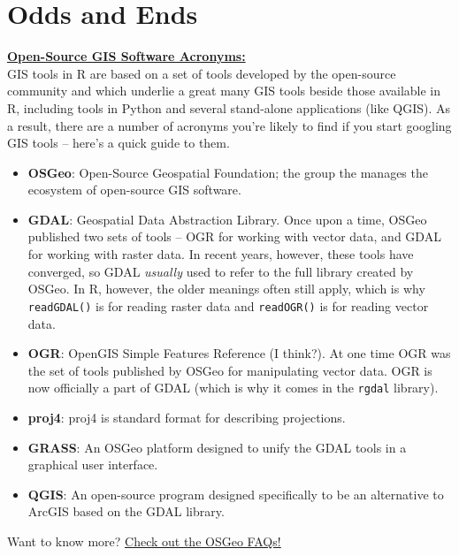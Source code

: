 \documentclass[10pt]{article}
\begin{document}

\section*{Odds and Ends}
\underline{\textbf{Open-Source GIS Software Acronyms:} }\\

\noindent GIS tools in R are based on a set of tools developed by the open-source community and which underlie a great many GIS tools beside those available in R, including tools in Python and several stand-alone applications (like QGIS). As a result, there are a number of acronyms you're likely to find if you start googling GIS tools -- here's a quick guide to them. \\
\begin{itemize}
	\item \textbf{OSGeo}: Open-Source Geospatial Foundation; the group the manages the ecosystem of open-source GIS software. 
	\item \textbf{GDAL}: Geospatial Data Abstraction Library. Once upon a time, OSGeo published two sets of tools -- OGR for working with vector data, and GDAL for working with raster data. In recent years, however, these tools have converged, so GDAL \emph{usually} used to refer to the full library created by OSGeo. In R, however, the older meanings often still apply, which is why \texttt{readGDAL()} is for reading raster data and \texttt{readOGR()} is for reading vector data. 
	\item \textbf{OGR}: OpenGIS Simple Features Reference (I think?). At one time OGR was the set of tools published by OSGeo for manipulating vector data. OGR is now officially a part of GDAL (which is why it comes in the \texttt{rgdal} library). 
	\item \textbf{proj4}: proj4 is standard format for describing projections.
	\item \textbf{GRASS}: An OSGeo platform designed to unify the GDAL tools in a graphical user interface. 
	\item \textbf{QGIS}: An open-source program designed specifically to be an alternative to ArcGIS based on the GDAL library. 
\end{itemize}
Want to know more? \href{https://trac.osgeo.org/gdal/wiki/FAQGeneral#WhatdoesOGRstandsfor}{\underline{Check out the OSGeo FAQs!}}

\end{document}

